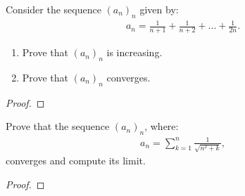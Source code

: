 \documentclass[11pt,twoside,openany]{memoir}
\begin{document}
\newpage
\fancyhead[L]{\scalebox{0.9}{Sequences}}
\fancyhead[R]{\scalebox{0.9}{Appeared on: W20}}
\begin{problem}
    Consider the sequence $(a_n)_n$ given by:
        \begin{equation*}
        \begin{split}
            a_n = \frac{1}{n+1} + \frac{1}{n+2} + ... + \frac{1}{2n}.
        \end{split}
        \end{equation*}
    \begin{enumerate}[label = (\arabic*)]
        \item Prove that $(a_n)_n$ is increasing.
        \item Prove that $(a_n)_n$ converges.
    \end{enumerate}
\end{problem}
\begin{proof}
\end{proof}

\newpage
\fancyhead[L]{\scalebox{0.9}{Sequences}}
\fancyhead[R]{\scalebox{0.9}{Appeared on: F17}}
\begin{problem}
    Prove that the sequence $(a_n)_n$, where:
        \begin{equation*}
        \begin{split}
            a_n = \sum_{k = 1}^n \frac{1}{\sqrt{n^2 + k}},
        \end{split}
        \end{equation*}
    converges and compute its limit.
\end{problem}
\begin{proof}
\end{proof}
\end{document}
